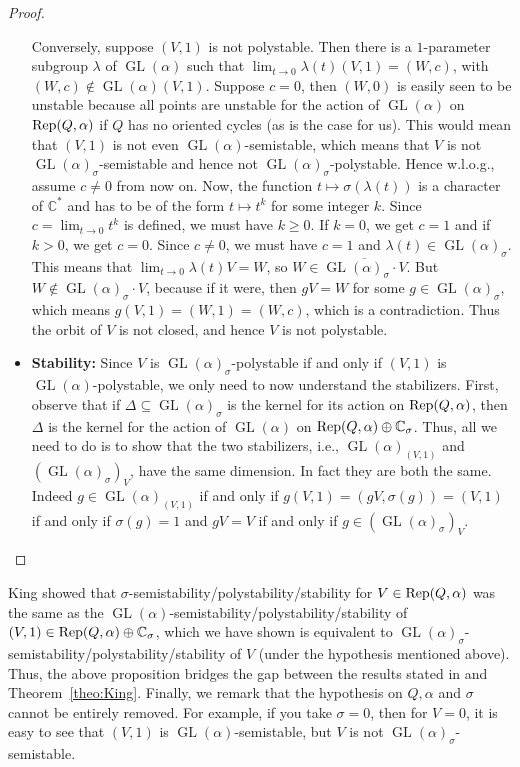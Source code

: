 \documentclass[11pt]{amsart}
\newcommand{\Vnote}[1]{\begin{quote}{\color{red}{{\sf Visu's Note:} {\sl{#1}}}} \end{quote}}
\theoremstyle{definition}
\newcommand{\Rep}{{\rm Rep}}
\newcommand{\C}{{\mathbb C}}
\newcommand{\GL}{\operatorname{GL}}
\begin{document}
\begin{proof}
\begin{itemize}
Conversely, suppose $(V,1)$ is not polystable. Then there is a $1$-parameter subgroup $\lambda$ of $\GL(\alpha)$ such that $\lim_{t \to 0} \lambda(t) (V,1) = (W,c)$, with $(W,c) \notin \GL(\alpha) (V,1)$. Suppose $c = 0$, then $(W,0)$ is easily seen to be unstable because all points are unstable for the action of $\GL(\alpha)$ on $\Rep(Q,\alpha)$ if $Q$ has no oriented cycles (as is the case for us). This would mean that $(V,1)$ is not even $\GL(\alpha)$-semistable, which means that $V$ is not $\GL(\alpha)_\sigma$-semistable and hence not $\GL(\alpha)_\sigma$-polystable. Hence w.l.o.g., assume $c \neq 0$ from now on.
Now, the function $t \mapsto \sigma(\lambda(t))$ is a character of $\C^*$ and has to be of the form $t \mapsto t^k$ for some integer $k$. Since $c = \lim_{t \to 0} t^k$ is defined, we must have $k \geq 0$. If $k = 0$, we get $c = 1$ and if $k > 0$, we get $c = 0$. Since $c \neq 0$, we must have $c = 1$ and $\lambda(t) \in \GL(\alpha)_\sigma$. This means that $\lim_{t \to 0} \lambda(t) V = W$, so $W \in \overline{\GL(\alpha)_\sigma \cdot V}$. But $W \notin \GL(\alpha)_\sigma \cdot V$, because if it were, then $g V = W$ for some $g \in \GL(\alpha)_\sigma$, which means $g(V,1) = (W,1) = (W,c)$, which is a contradiction. Thus the orbit of $V$ is not closed, and hence $V$ is not polystable.
 
\item {\bf Stability:} Since $V$ is $\GL(\alpha)_\sigma$-polystable if and only if $(V,1)$ is $\GL(\alpha)$-polystable, we only need to now understand the stabilizers. First, observe that if $\Delta \subseteq \GL(\alpha)_\sigma$ is the kernel for its action on $\Rep(Q,\alpha)$, then $\Delta$ is the kernel for the action of $\GL(\alpha)$ on $\Rep(Q,\alpha) \oplus \C_\sigma$. Thus, all we need to do is to show that the two stabilizers, i.e., $\GL(\alpha)_{(V,1)}$ and $(\GL(\alpha)_\sigma)_V$, have the same dimension. In fact they are both the same. Indeed $g \in \GL(\alpha)_{(V,1)}$ if and only if $g(V,1) = (gV, \sigma(g)) =  (V,1)$ if and only if $\sigma(g) = 1$ and $gV = V$ if and only if $g \in (\GL(\alpha)_\sigma)_V$.

\end{itemize}
\end{proof}

King \cite{King} showed that $\sigma$-semistability/polystability/stability for $V \in \Rep(Q,\alpha)$ was the same as the $\GL(\alpha)$-semistability/polystability/stability of $(V,1) \in \Rep(Q,\alpha) \oplus \C_\sigma$, which we have shown is equivalent to $\GL(\alpha)_\sigma$-semistability/polystability/stability of $V$ (under the hypothesis mentioned above). Thus, the above proposition bridges the gap between the results stated in \cite{King} and Theorem~\ref{theo:King}. Finally, we remark that the hypothesis on $Q,\alpha$ and $\sigma$ cannot be entirely removed. For example, if you take $\sigma = 0$, then for $V = 0$, it is easy to see that $(V,1)$ is $\GL(\alpha)$-semistable, but $V$ is not $\GL(\alpha)_\sigma$-semistable.

\end{document}
